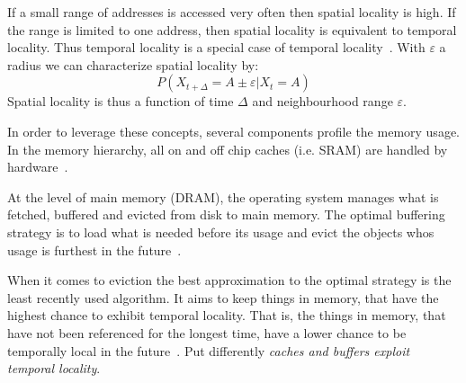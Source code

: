     If a small range of addresses is accessed very often then spatial locality is high.
    If the range is limited to one address, then spatial locality is equivalent to temporal locality. Thus temporal locality is a special case of temporal locality~\autocite{gupta2013locality}.
    With $\varepsilon$ a radius we can characterize spatial locality by:
    \[ P(X_{t + \Delta} = A \pm \varepsilon | X_t = A) \]
    Spatial locality is thus a function of time $\Delta$ and neighbourhood range $\varepsilon$. 
    
    In order to leverage these concepts, several components profile the memory usage.
    In the memory hierarchy, all on and off chip caches (i.e. SRAM) are handled by hardware~\autocite{jacob2010memory}.
    
    At the level of main memory (DRAM), the operating system manages what is fetched, buffered and evicted from disk to main memory. 
    The optimal buffering strategy is to load what is needed before its usage and evict the objects whos usage is furthest in the future~\autocite{tanenbaum2015modern}. 
    
    When it comes to eviction the best approximation to the optimal strategy is the least recently used algorithm. 
    It aims to keep things in memory, that have the highest chance to exhibit temporal locality.
    That is, the things in memory, that have not been referenced for the longest time, have a lower chance to be temporally local in the future~\autocite{silberschatz2006operating}.
    Put differently \textit{caches and buffers exploit temporal locality}.
    
